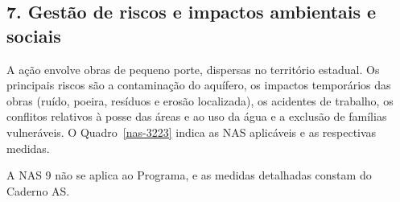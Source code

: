 {}
\subsection*{7. Gestão de riscos e impactos ambientais e sociais}

A ação envolve obras de pequeno porte, dispersas no território estadual. Os principais riscos são a contaminação do aquífero, os impactos temporários das obras (ruído, poeira, resíduos e erosão localizada), os acidentes de trabalho, os conflitos relativos à posse das áreas e ao uso da água e a exclusão de famílias vulneráveis. O Quadro~\ref{nas-3223} indica as NAS aplicáveis e as respectivas medidas.

A NAS 9 não se aplica ao Programa, e as medidas detalhadas constam do Caderno AS.

